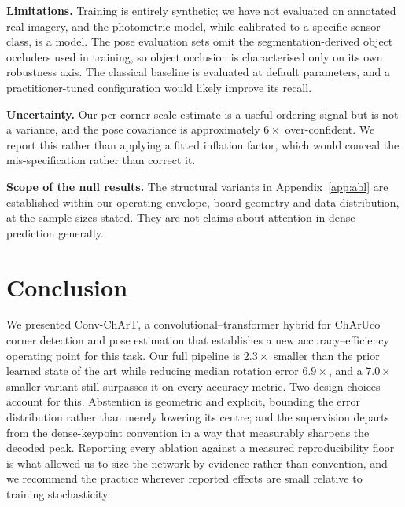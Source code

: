 \documentclass[10pt,twocolumn,letterpaper]{article}
\begin{document}
\textbf{Limitations.} Training is entirely synthetic; we have not evaluated on annotated real
imagery, and the photometric model, while calibrated to a specific sensor class, is a model. The
pose evaluation sets omit the segmentation-derived object occluders used in training, so object
occlusion is characterised only on its own robustness axis. The classical baseline is evaluated at
default parameters, and a practitioner-tuned configuration would likely improve its recall.

\textbf{Uncertainty.} Our per-corner scale estimate is a useful ordering signal but is not a
variance, and the pose covariance is approximately $6\times$ over-confident. We report this rather
than applying a fitted inflation factor, which would conceal the mis-specification rather than
correct it.

\textbf{Scope of the null results.} The structural variants in Appendix~\ref{app:abl} are
established within our operating envelope, board geometry and data distribution, at the sample
sizes stated. They are not claims about attention in dense prediction generally.

\section{Conclusion}

We presented Conv-ChArT, a convolutional--transformer hybrid for ChArUco corner detection and pose
estimation that establishes a new accuracy--efficiency operating point for this task. Our full
pipeline is $2.3\times$ smaller than the prior learned state of the art while reducing median
rotation error $6.9\times$, and a $7.0\times$ smaller variant still surpasses it on every accuracy
metric. Two design choices account for this. Abstention is geometric and explicit, bounding the
error distribution rather than merely lowering its centre; and the supervision departs from the
dense-keypoint convention in a way that measurably sharpens the decoded peak. Reporting every
ablation against a measured reproducibility floor is what allowed us to size the network by
evidence rather than convention, and we recommend the practice wherever reported effects are small
relative to training stochasticity.
\end{document}
